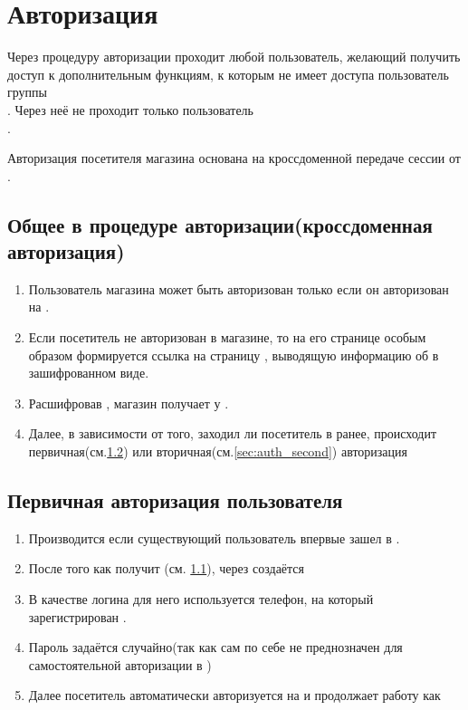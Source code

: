 \chapter{Авторизация}
    \label{sec:auth}
    
    Через процедуру авторизации проходит любой пользователь, желающий получить 
    доступ к дополнительным функциям, к которым не имеет доступа пользователь группы
    \\. Через неё не проходит только пользователь \\.
    
    Авторизация посетителя магазина основана на кроссдоменной передаче сессии от .

    \section{Общее в процедуре авторизации(кроссдоменная авторизация)}
    \label{sec:auth_common}
    
        \begin{enumerate}
            \item Пользователь магазина может быть авторизован только если он авторизован на .
            \item Если посетитель не авторизован в магазине, то на его странице особым образом формируется 
                ссылка на страницу , выводящую информацию об  в зашифрованном виде.
            \item Расшифровав , магазин получает  у .
            \item Далее, в зависимости от того, заходил ли посетитель в  ранее, 
                происходит первичная(см.\ref{sec:auth_first}) или вторичная(см.\ref{sec:auth_second}) авторизация
        \end{enumerate}
    
    \section{Первичная авторизация пользователя}
    \label{sec:auth_first}

        \begin{enumerate}
            \item Производится если существующий пользователь  впервые зашел в .
            \item После того как  получит  (см. \ref{sec:auth_common}), через  создаётся 
            \item В качестве логина для него используется телефон, на который зарегистрирован .
            \item Пароль задаётся случайно(так как сам по себе  не преднозначен для самостоятельной авторизации в )
            \item Далее посетитель автоматически авторизуется на  и продолжает работу как 
        \end{enumerate}
    
